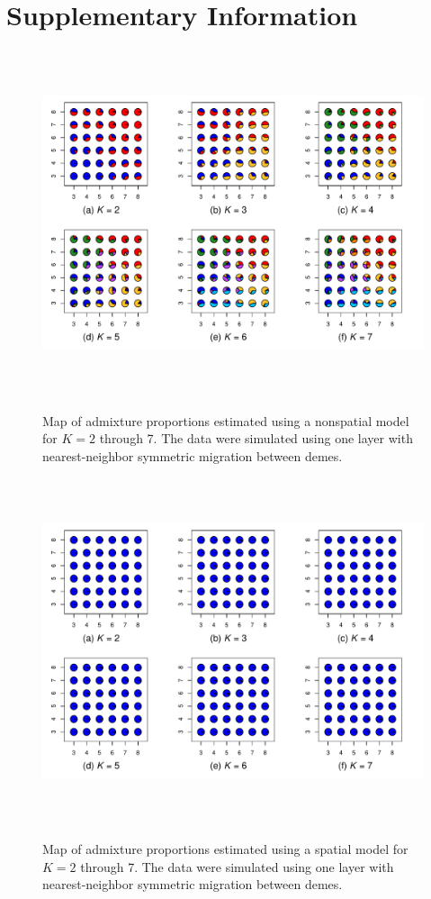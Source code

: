 \documentclass[10pt,letterpaper]{article}
\begin{document}
\section*{Supplementary Information}
\renewcommand{\theequation}{S\arabic{equation}}
\setcounter{equation}{0}
\renewcommand{\thetable}{S\arabic{table}}
\setcounter{table}{0}
\renewcommand{\thefigure}{S\arabic{figure}}
\setcounter{figure}{0}

\newpage
\begin{figure}
	\centering
		{\includegraphics[width=6in,height=4in]{figs/sims/simK1_nsp_pies.pdf}}
	\caption{
	Map of admixture proportions estimated using a nonspatial model for $K=2$ through 7.
	The data were simulated using one layer with nearest-neighbor symmetric migration between demes.
    }\label{simK1_nsp_pies}
\end{figure}

\begin{figure}
	\centering
		{\includegraphics[width=6in,height=4in]{figs/sims/simK1_sp_pies.pdf}}
	\caption{
	Map of admixture proportions estimated using a spatial model for $K=2$ through 7.
	The data were simulated using one layer with nearest-neighbor symmetric migration between demes.
    }\label{simK1_sp_pies}
\end{figure}
\end{document}
